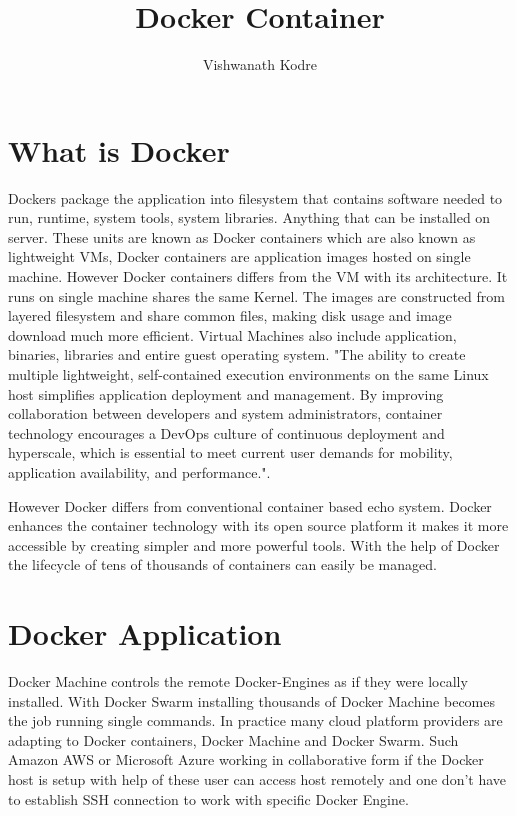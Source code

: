 \documentclass[9pt,twocolumn,twoside]{styles/osajnl}
\title{Docker Container}
\author[1,*]{Vishwanath Kodre}
\affil[1]{School of Informatics and Computing, Bloomington, IN 47408, U.S.A.}
\affil[*]{Corresponding authors: vkodre@iu.edu}
\begin{document}
\maketitle

\section{What is Docker}
Dockers package the application into filesystem that contains software needed to run, runtime, system tools, system libraries. Anything that can be installed on server. These units are known as Docker containers which are also known as lightweight VMs, Docker containers are application images hosted on single machine. However Docker containers differs from the VM with its architecture. It runs on single machine shares the same Kernel. The images are constructed from layered filesystem and share common files, making disk usage and image download much more efficient. Virtual Machines also include application, binaries, libraries and entire guest operating system. "The ability to create multiple lightweight, self-contained execution environments on the same Linux host simplifies application deployment and management. By improving collaboration between developers and system administrators, container technology encourages a DevOps culture of continuous deployment and hyperscale, which is essential to meet current user demands for mobility, application availability, and performance."\cite{DockerandtheLinuxcontainerecosystem}.

However Docker differs from conventional container based echo system. Docker enhances the container technology with its open source platform it makes it more accessible by creating simpler and more powerful tools. With the help of Docker the lifecycle of tens of thousands of containers can easily be managed.

\section{Docker Application}
Docker Machine controls the remote Docker-Engines as if they were locally installed. With Docker Swarm installing thousands of Docker Machine becomes the job running single commands. In practice many cloud platform providers are adapting to Docker containers, Docker Machine and Docker Swarm. Such Amazon AWS or Microsoft Azure working in collaborative form if the Docker host is setup with help of these user can access host remotely and one don't have to establish SSH connection to work with specific Docker Engine.
\end{document}
